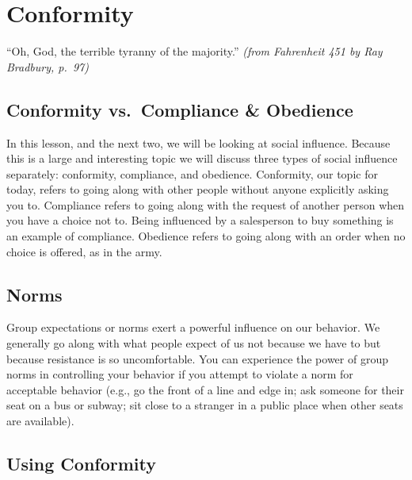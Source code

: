 \documentclass[
]{book}
\begin{document}
\hypertarget{conformity}{%
\section{Conformity}\label{conformity}}

``Oh, God, the terrible tyranny of the majority.'' \emph{(from Fahrenheit 451 by Ray Bradbury, p.~97)}

\hypertarget{conformity-vs.-compliance-obedience}{%
\subsection*{Conformity vs.~Compliance \& Obedience}\label{conformity-vs.-compliance-obedience}}

In this lesson, and the next two, we will be looking at social influence. Because this is a large and interesting topic we will discuss three types of social influence separately: conformity, compliance, and obedience. Conformity, our topic for today, refers to going along with other people without anyone explicitly asking you to. Compliance refers to going along with the request of another person when you have a choice not to. Being influenced by a salesperson to buy something is an example of compliance. Obedience refers to going along with an order when no choice is offered, as in the army.

\hypertarget{norms}{%
\subsection*{Norms}\label{norms}}

Group expectations or norms exert a powerful influence on our behavior. We generally go along with what people expect of us not because we have to but because resistance is so uncomfortable. You can experience the power of group norms in controlling your behavior if you attempt to violate a norm for acceptable behavior (e.g., go the front of a line and edge in; ask someone for their seat on a bus or subway; sit close to a stranger in a public place when other seats are available).

\hypertarget{using-conformity}{%
\subsection*{Using Conformity}\label{using-conformity}}
\end{document}
